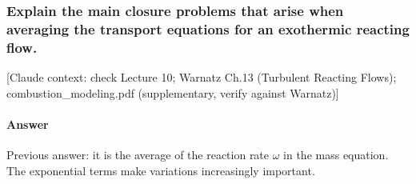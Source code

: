 \subsubsection{Explain the main closure problems that arise when averaging the transport equations for an exothermic reacting flow.}

{\color{gray}\footnotesize [Claude context: check Lecture 10; Warnatz Ch.13 (Turbulent Reacting Flows); combustion\_modeling.pdf (supplementary, verify against Warnatz)]}
\label{Q:clouseure}
\paragraph{Answer}

Previous answer: it is the average of the reaction rate $\omega$ in the mass equation. The exponential terms make variations increasingly important.

